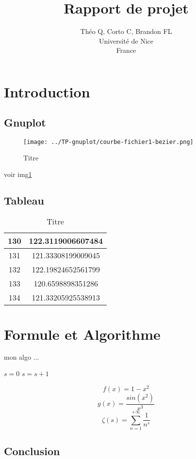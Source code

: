 \documentclass{article}
\title{Rapport de projet}
\author{Théo Q, Corto C, Brandon FL \\
Université de Nice\\
France}
\begin{document}
\maketitle


\section{Introduction}



\subsection{Gnuplot}
\begin{figure}[h]
\centering
\texttt{[image: ../TP-gnuplot/courbe-fichier1-bezier.png]} 
\caption{Titre}
\label{fig:toto}
\end{figure}
voir img\ref{fig:toto}

\subsection{Tableau}
\begin{table}[h]
\centering
\begin{tabular}{|c|c|}
\hline 
130 & 122.3119006607484 \\ 
\hline 
131 & 121.33308199009045 \\ 
\hline 
132 & 122.19824652561799 \\ 
\hline 
133 & 120.6598898351286 \\ 
\hline 
134 & 121.33205925538913 \\ 
\hline 
\end{tabular} 
\caption{Titre}
\label{tab:toto2}
\end{table}


\section{Formule et Algorithme}
\begin{algorithm}[H]
\caption{mon algo ...}
\begin{algorithmic}[1]
\STATE $s =0$
\STATE $s= s + 1$
\ENDIF
\ENDFOR
\end{algorithmic}
\end{algorithm}

\begin{equation}
f(x)=1 - x^2
\end{equation}
\begin{equation}
g(x)=\frac{sin(x^2)}{x^3}
\end{equation}
\begin{equation}
\zeta(s)= \sum_{n=1}^{+\infty}\frac1{n^s}
\end{equation}

\subsection{Conclusion}
\end{document}
